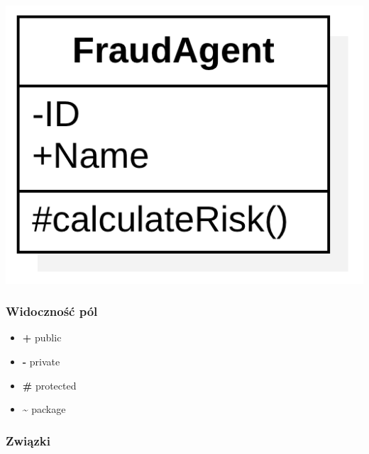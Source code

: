 \documentclass[12pt]{article}
\begin{document}
                \begin{center}
                    \includegraphics[scale=0.40]{ooad/class.png}
                \end{center}
                    
            \subsubsection{Widoczność pól}

                \begin{itemize}
                    \item \textbf{+} public
                    \item \textbf{-} private
                    \item \textbf{\#} protected
                    \item \textbf{\~} package 
                \end{itemize}

            \subsubsection{Związki}
\end{document}
